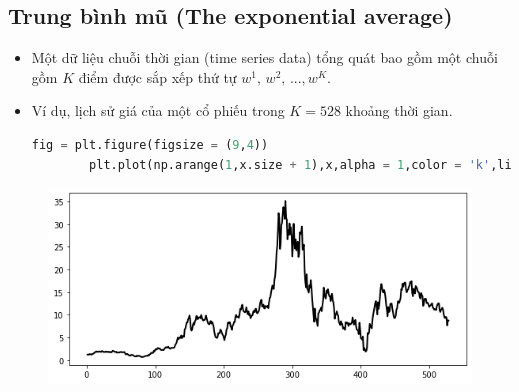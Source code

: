 \documentclass{book}
\begin{document}
\subsection{Trung bình mũ (The exponential average)}
\begin{itemize}
    \item Một dữ liệu chuỗi thời gian (time series data) tổng quát bao gồm một chuỗi gồm $K$ điểm được sắp xếp thứ tự $w^1,\,w^2,\,...,w^K$.
    \item Ví dụ, lịch sử giá của một cổ phiếu trong $K=528$ khoảng thời gian.
    \begin{lstlisting}[language=Python, caption={Đoạn mã Python để vẽ đồ thị với trung bình mũ (exponential average).}, label={code:matplotlib_plot}]
        fig = plt.figure(figsize = (9,4))
        plt.plot(np.arange(1,x.size + 1),x,alpha = 1,color = 'k',linewidth = 2,zorder = 2);
    \end{lstlisting}
\end{itemize}
\begin{figure}[H]
    \centering
    \includegraphics[width=\textwidth]{images/exponential_average.png}
\end{figure}
\end{document}
